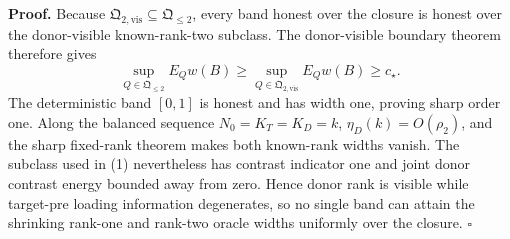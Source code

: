 \textbf{Proof.}
Because \(\mathfrak Q_{2,\mathrm{vis}}\subseteq\mathfrak Q_{\le2}\), every band honest over the closure is honest over the donor-visible known-rank-two subclass. The donor-visible boundary theorem therefore gives
\[
 \sup_{Q\in\mathfrak Q_{\le2}}E_Qw(B)
 \ge\sup_{Q\in\mathfrak Q_{2,\mathrm{vis}}}E_Qw(B)
 \ge c_\star.                                             \tag{1}
\]
The deterministic band \([0,1]\) is honest and has width one, proving sharp order one. Along the balanced sequence \(N_0=K_T=K_D=k\), \(\eta_D(k)=O(\rho_2)\), and the sharp fixed-rank theorem makes both known-rank widths vanish. The subclass used in (1) nevertheless has contrast indicator one and joint donor contrast energy bounded away from zero. Hence donor rank is visible while target-pre loading information degenerates, so no single band can attain the shrinking rank-one and rank-two oracle widths uniformly over the closure. \(\square\)